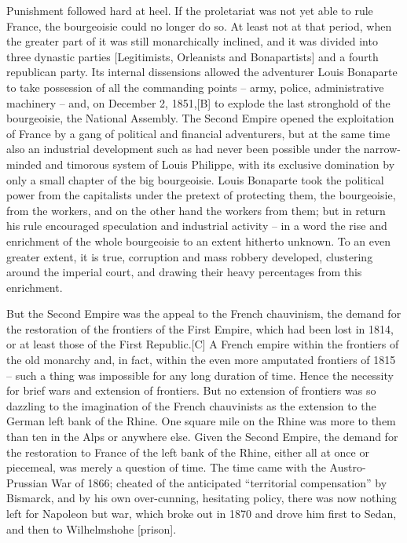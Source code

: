\documentclass{book}
\begin{document}
Punishment followed hard at heel. If the proletariat was not yet able to
rule France, the bourgeoisie could no longer do so. At least not at that
period, when the greater part of it was still monarchically inclined, and
it was divided into three dynastic parties [Legitimists, Orleanists and
Bonapartists] and a fourth republican party. Its internal dissensions
allowed the adventurer Louis Bonaparte to take possession of all the
commanding points – army, police, administrative machinery – and, on
December 2, 1851,[B] to explode the last stronghold of the bourgeoisie,
the National Assembly. The Second Empire opened the exploitation of France
by a gang of political and financial adventurers, but at the same time
also an industrial development such as had never been possible under the
narrow-minded and timorous system of Louis Philippe, with its exclusive
domination by only a small chapter of the big bourgeoisie. Louis Bonaparte
took the political power from the capitalists under the pretext of
protecting them, the bourgeoisie, from the workers, and on the other hand
the workers from them; but in return his rule encouraged speculation and
industrial activity – in a word the rise and enrichment of the whole
bourgeoisie to an extent hitherto unknown. To an even greater extent, it
is true, corruption and mass robbery developed, clustering around the
imperial court, and drawing their heavy percentages from this enrichment.

But the Second Empire was the appeal to the French chauvinism, the demand
for the restoration of the frontiers of the First Empire, which had been
lost in 1814, or at least those of the First Republic.[C] A French empire
within the frontiers of the old monarchy and, in fact, within the even
more amputated frontiers of 1815 – such a thing was impossible for any
long duration of time. Hence the necessity for brief wars and extension of
frontiers. But no extension of frontiers was so dazzling to the
imagination of the French chauvinists as the extension to the German left
bank of the Rhine. One square mile on the Rhine was more to them than ten
in the Alps or anywhere else. Given the Second Empire, the demand for the
restoration to France of the left bank of the Rhine, either all at once or
piecemeal, was merely a question of time. The time came with the
Austro-Prussian War of 1866; cheated of the anticipated “territorial
compensation” by Bismarck, and by his own over-cunning, hesitating policy,
there was now nothing left for Napoleon but war, which broke out in 1870
and drove him first to Sedan, and then to Wilhelmshohe [prison].
\end{document}
